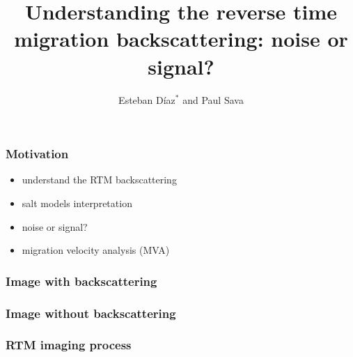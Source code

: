 



\title[]{Understanding the reverse time migration backscattering:
noise or signal?}
\subtitle{}
\author[]{Esteban  D\'{i}az$^{*}$ and Paul Sava}
\date{}
\logo{}

\def\big#1{\begin{center} \LARGE \textbf{#1} \end{center}}
\def\cen#1{\begin{center}        \textbf{#1} \end{center}}

 { \cwpcover }



\begin{frame}  \frametitle{Motivation}
	\begin{itemize}
		\item understand the RTM backscattering
		\item salt models interpretation
		\item noise or signal? 
		\item migration velocity analysis (MVA)
	\end{itemize}
\end{frame}




\begin{frame} \frametitle{Image with backscattering}    \end{frame}
\begin{frame} \frametitle{Image without backscattering} \end{frame}

\begin{frame} \frametitle{RTM imaging process}    \end{frame}






